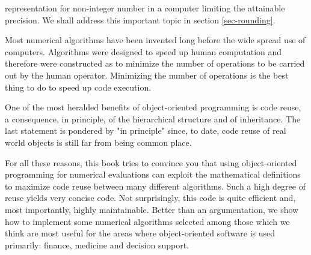 \documentclass[twoside]{book}
\begin{document}
representation for non-integer number in a computer limiting the
attainable precision. We shall address this important topic in
section \ref{sec-rounding}.
\par
Most numerical algorithms have been invented long before the wide
spread use of computers. Algorithms were designed to speed up
human computation and therefore were constructed as to minimize
the number of operations to be carried out by the human operator.
Minimizing the number of operations is the best thing to do to
speed up code execution.
\par
One of the most heralded benefits of object-oriented programming
is code reuse, a consequence, in principle, of the hierarchical
structure and of inheritance. The last statement is pondered by
"in principle" since, to date, code reuse of real world objects is
still far from being common place.
\par
For all these reasons, this book tries to convince you that using
object-oriented programming for numerical evaluations can exploit
the mathematical definitions to maximize code reuse between many
different algorithms. Such a high degree of reuse yields very
concise code. Not surprisingly, this code is quite efficient and,
most importantly, highly maintainable. Better than an
argumentation, we show how to implement some numerical algorithms
selected among those which we think are most useful for the areas
where object-oriented software is used primarily: finance,
medicine and decision support.
\end{document}
